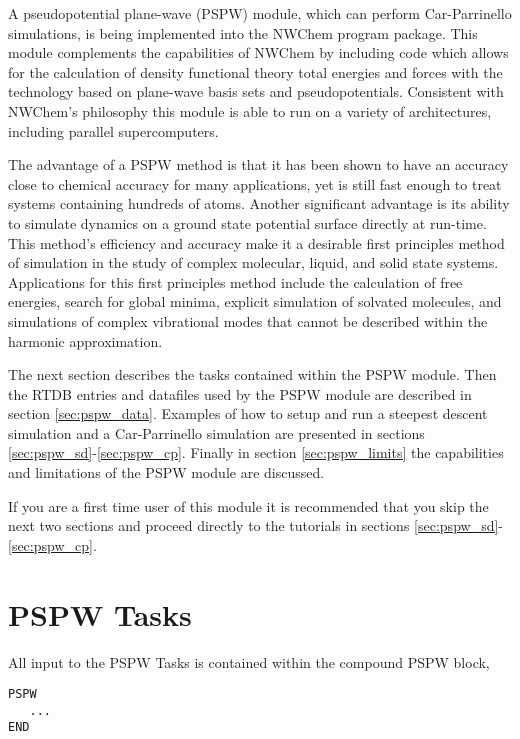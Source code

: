 \label{sec:pspw}

A pseudopotential plane-wave (PSPW) module, which can perform Car-Parrinello
simulations, is being implemented into the NWChem program package.  
This module complements the capabilities of NWChem by including code 
which allows for the calculation of density functional theory total energies 
and forces with the technology based on plane-wave basis sets and 
pseudopotentials.  Consistent with NWChem's philosophy this module is able 
to run on a variety of architectures, including parallel supercomputers.

The advantage of a PSPW method is that it has been shown to have an accuracy 
close to chemical accuracy for many applications, yet is still fast enough 
to treat systems containing hundreds of atoms.  Another significant advantage 
is its ability to simulate dynamics on a ground state potential surface 
directly at run-time.  This method's efficiency and accuracy make it a 
desirable first principles method of simulation in the study of complex 
molecular, liquid, and solid state systems.  Applications for this first 
principles method include the calculation of free energies, search for 
global minima, explicit simulation of solvated molecules, and simulations 
of complex vibrational modes that cannot be described within the harmonic 
approximation.

The next section describes the tasks contained within the PSPW module.
Then the RTDB entries and datafiles used by the PSPW module are described 
in section \ref{sec:pspw_data}.  Examples of how to setup and run
a steepest descent simulation and a Car-Parrinello simulation are presented
in sections \ref{sec:pspw_sd}-\ref{sec:pspw_cp}.  Finally in section
\ref{sec:pspw_limits} the capabilities and limitations of the PSPW
module are discussed.

If you are a first time user of this module it is recommended that you skip
the next two sections and proceed directly to the tutorials in sections 
\ref{sec:pspw_sd}-\ref{sec:pspw_cp}.

\section{PSPW Tasks}
\label{sec:pspw_tasks}

All input to the PSPW Tasks is contained within the compound PSPW  block,
\begin{verbatim}
PSPW
   ...
END
\end{verbatim}

